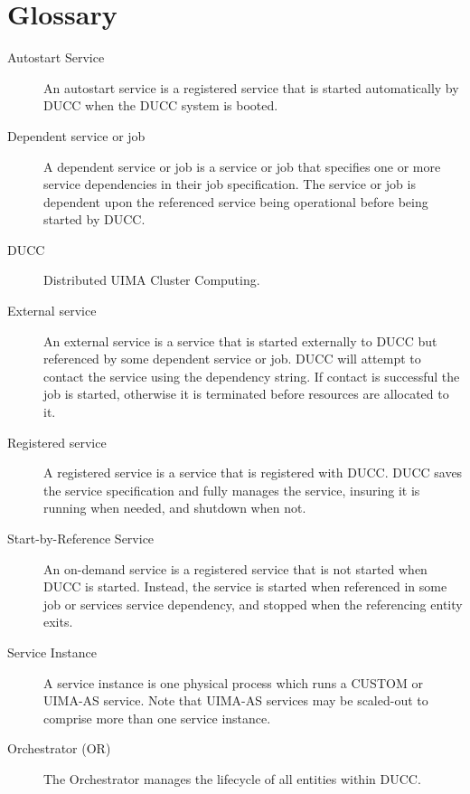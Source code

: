 \ifpdf
\else
{}
\fi
\chapter{Glossary}

\begin{description}
\item[Autostart Service] An autostart service is a registered service that is started automatically
  by DUCC when the DUCC system is booted.

\item[Dependent service or job] A dependent service or job is a service or job that specifies one
  or more service dependencies in their job specification. The service or job is dependent upon the
  referenced service being operational before being started by DUCC.

\item[DUCC] Distributed UIMA Cluster Computing.

\item[External service] An external service is a service that is started externally to DUCC but
  referenced by some dependent service or job.  DUCC will attempt to contact the service using
  the dependency string.  If contact is successful the job is started, otherwise it is 
  terminated before resources are allocated to it.

\item[Registered service] A registered service is a service that is registered with DUCC. DUCC
  saves the service specification and fully manages the service, insuring it is running when needed,
  and shutdown when not.

\item[Start-by-Reference Service] An on-demand service is a registered service that is not started when DUCC
  is started. Instead, the service is started when referenced in some job or services service
  dependency, and stopped when the referencing entity exits.

\item[Service Instance] A service instance is one physical process which runs a CUSTOM or UIMA-AS
  service.  Note that UIMA-AS services may be scaled-out to comprise more than one service instance.

\item[Orchestrator (OR)] The Orchestrator manages the lifecycle of all entities within DUCC.


\end{description}
